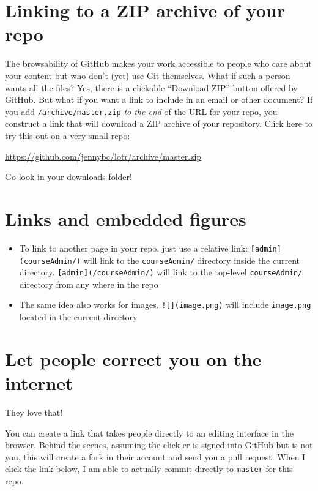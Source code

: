 \documentclass[
]{book}
\begin{document}
\section{Linking to a ZIP archive of your repo}\label{linking-to-a-zip-archive-of-your-repo}

The browsability of GitHub makes your work accessible to people who care about your content but who don't (yet) use Git themselves. What if such a person wants all the files? Yes, there is a clickable ``Download ZIP'' button offered by GitHub. But what if you want a link to include in an email or other document? If you add \texttt{/archive/master.zip} \emph{to the end} of the URL for your repo, you construct a link that will download a ZIP archive of your repository. Click here to try this out on a very small repo:

\url{https://github.com/jennybc/lotr/archive/master.zip}

Go look in your downloads folder!

\section{Links and embedded figures}\label{links-and-embedded-figures}

\begin{itemize}
\item
  To link to another page in your repo, just use a relative link: \texttt{{[}admin{]}(courseAdmin/)} will link to the \texttt{courseAdmin/} directory inside the current directory. \texttt{{[}admin{]}(/courseAdmin/)} will link to the top-level \texttt{courseAdmin/} directory from any where in the repo
\item
  The same idea also works for images. \texttt{!{[}{]}(image.png)} will include \texttt{image.png} located in the current directory
\end{itemize}

\section{Let people correct you on the internet}\label{let-people-correct-you-on-the-internet}

They love that!

You can create a link that takes people directly to an editing interface in the browser. Behind the scenes, assuming the click-er is signed into GitHub but is not you, this will create a fork in their account and send you a pull request. When I click the link below, I am able to actually commit directly to \texttt{master} for this repo.
\end{document}
